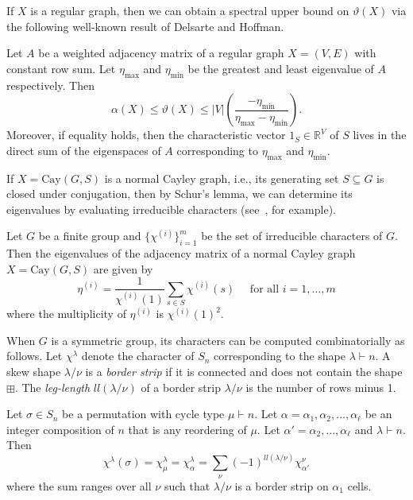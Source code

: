 \documentclass[12pt]{article}
\begin{document}
If $X$ is a regular graph, then we can obtain a spectral upper bound on $\vartheta(X)$ via the following well-known result of Delsarte and Hoffman. 
\begin{theorem}\label{thm:ratioInd}
Let $A$ be a weighted adjacency matrix of a regular graph $X = (V,E)$ with constant row sum. Let $\eta_{\max}$ and $\eta_{\min}$ be the greatest and least eigenvalue of $A$ respectively. Then 
$$\alpha(X) \leq  \vartheta(X) \leq |V|  \left( \frac{-\eta_{\min} }{\eta_{\max}-\eta_{\min}} \right).$$
Moreover, if equality holds, then the characteristic vector $1_S \in \mathbb{R}^{V}$ of $S$ lives in the direct sum of the eigenspaces of $A$ corresponding to $\eta_{\max}$ and $\eta_{\min}$.
\end{theorem}
If $X = \mathrm{Cay}(G,S)$ is a normal Cayley graph, i.e., its generating set $S \subseteq G$ is closed under conjugation, then by Schur's lemma, we can determine its eigenvalues by evaluating irreducible characters (see~\cite{Diaconis88}, for example).
\begin{theorem}
Let $G$ be a finite group and $\{\chi^{(i)}\}_{i=1}^m$ be the set of irreducible characters of $G$. Then the eigenvalues of the adjacency matrix of a normal Cayley graph $X = \mathrm{Cay}(G, S)$ are given by
$$\eta^{(i)} = \frac{1}{\chi^{(i)}(1)} \sum_{s \in S} \chi^{(i)}(s) \quad \text{ for all } i = 1,\ldots,m$$ 
where the multiplicity of $\eta^{(i)}$ is $\chi^{(i)}(1)^2$.
\end{theorem}
\noindent When $G$ is a symmetric group, its characters can be computed combinatorially as follows. Let $\chi^\lambda$ denote the character of $S_n$ corresponding to the shape $\lambda \vdash n$. A skew shape $\lambda / \nu$ is a \emph{border strip} if it is connected and does not contain the shape $\boxplus$. The \emph{leg-length} $ll(\lambda / \nu)$ of a border strip $\lambda / \nu$ is the number of rows minus 1.
\begin{theorem}\label{thm:mn} Let $\sigma \in S_n$ be a permutation with cycle type $\mu \vdash n$. Let $\alpha = \alpha_1,\alpha_2, \ldots, \alpha_\ell$ be an integer composition of $n$ that is any reordering of $\mu$. Let $\alpha' = \alpha_2, \ldots, \alpha_\ell$ and $\lambda \vdash n$. Then 
$$
	\chi^{\lambda}(\sigma) = \chi^{\lambda}_\mu = \chi^{\lambda}_\alpha = \sum_{\nu} (-1)^{ll(\lambda /\nu)} \chi^{\nu}_{\alpha'}
$$
where the sum ranges over all $\nu$ such that $\lambda / \nu$ is a border strip on $\alpha_1$ cells.
\end{theorem}
\end{document}
